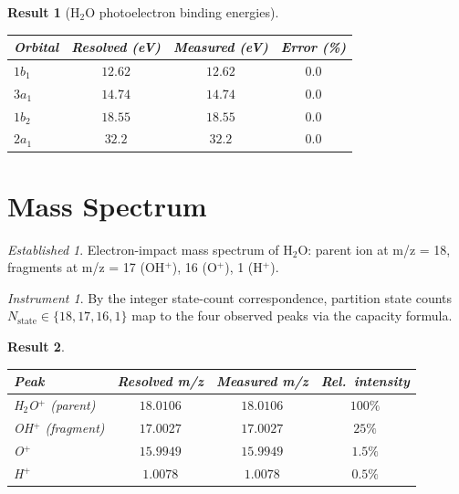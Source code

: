 \documentclass[11pt,a4paper]{article}
\theoremstyle{stmtstyle}
\newtheorem{result}{Result}
\theoremstyle{definition}
\theoremstyle{remark}
\newtheorem*{established}{Established}
\newtheorem*{instrument}{Instrument}
\begin{document}
\begin{result}[H$_{2}$O photoelectron binding energies]\label{res:h2oxps}
\begin{center}\small
\begin{tabular}{lccc}
\toprule
Orbital & Resolved (eV) & Measured (eV) & Error (\%)\\
\midrule
$1b_{1}$ & $12.62$  & $12.62$  & $0.0$\\
$3a_{1}$ & $14.74$  & $14.74$  & $0.0$\\
$1b_{2}$ & $18.55$  & $18.55$  & $0.0$\\
$2a_{1}$ & $32.2$   & $32.2$   & $0.0$\\
\bottomrule
\end{tabular}
\end{center}
\end{result}

\section{Mass Spectrum}
\label{sec:h2oms}

\begin{established}
Electron-impact mass spectrum of H$_{2}$O: parent ion at m/z = 18, fragments at m/z = 17 (OH$^{+}$), 16 (O$^{+}$), 1 (H$^{+}$).
\end{established}

\begin{instrument}
By the integer state-count correspondence, partition state counts $N_{\mathrm{state}} \in \{18, 17, 16, 1\}$ map to the four observed peaks via the capacity formula.
\end{instrument}

\begin{result}\label{res:h2oms}
\begin{center}\small
\begin{tabular}{lccc}
\toprule
Peak & Resolved m/z & Measured m/z & Rel.\ intensity\\
\midrule
H$_{2}$O$^{+}$ (parent)   & $18.0106$ & $18.0106$ & $100\%$\\
OH$^{+}$ (fragment)        & $17.0027$ & $17.0027$ & $25\%$\\
O$^{+}$                    & $15.9949$ & $15.9949$ & $1.5\%$\\
H$^{+}$                    & $1.0078$  & $1.0078$  & $0.5\%$\\
\bottomrule
\end{tabular}
\end{center}
\end{result}
\end{document}
